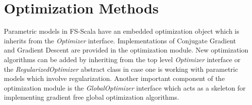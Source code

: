 \section{Optimization Methods}
Parametric models in FS-Scala have an embedded optimization object which is inherits from the \textit{Optimizer} interface. Implementations of Conjugate Gradient and Gradient Descent are provided in the optimization module. New optimization algorithms can be added by inheriting from the top level \textit{Optimizer} interface or the \textit{RegularizedOptimizer} abstract class in case one is working with parametric models which involve regularization. Another important component of the optimization module is the \textit{GlobalOptimizer} interface which acts as a skeleton for implementing gradient free global optimization algorithms.

